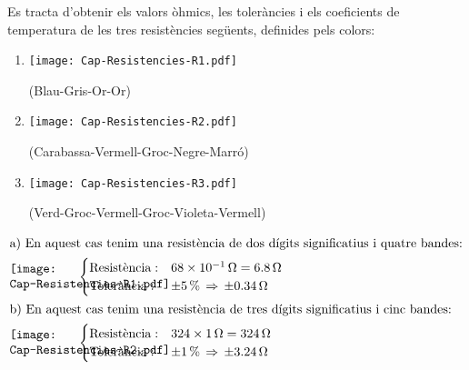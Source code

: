 \begin{exemple}\label{ex:resistencies-colors}
   Es tracta d'obtenir els valors òhmics, les toleràncies i els coeficients de temperatura de les tres resistències següents,
   definides pels colors:
    \begin{enumerate}
       \renewcommand{\labelenumi}{\alph{enumi})}
       \item \begin{minipage}{1.8cm}
               \texttt{[image: Cap-Resistencies-R1.pdf]}
            \end{minipage} (Blau-Gris-Or-Or)
       \item  \begin{minipage}{1.8cm}
               \texttt{[image: Cap-Resistencies-R2.pdf]}
            \end{minipage} (Carabassa-Vermell-Groc-Negre-Marró)
        \item  \begin{minipage}{1.8cm}
        	\texttt{[image: Cap-Resistencies-R3.pdf]}
        \end{minipage} (Verd-Groc-Vermell-Groc-Violeta-Vermell)
    \end{enumerate}
    \begin{align*}
       \intertext{a) En aquest  cas tenim una resistència de dos dígits significatius i quatre bandes:}
      \begin{minipage}{1.8cm}
      	\texttt{[image: Cap-Resistencies-R1.pdf]}
      \end{minipage}  \,  &
       \begin{cases}
          \text{Resistència}: &\qty{68e-1}{\ohm} = \qty{6,8}{\ohm} \\
          \text{Tolerància}:  &\qty{\pm 5}{\percent} \, \Rightarrow \, \qty{\pm 0,34}{\ohm}
       \end{cases} \\
       \intertext{b) En aquest  cas  tenim una resistència de tres dígits significatius i cinc bandes:}
       \begin{minipage}{1.8cm}
       	\texttt{[image: Cap-Resistencies-R2.pdf]}
       \end{minipage} \,  &
       \begin{cases}
          \text{Resistència}: &324 \times \qty{1}{\ohm} = \qty{324}{\ohm} \\
          \text{Tolerància}:  &\qty{\pm 1}{\percent} \, \Rightarrow \, \qty{\pm 3,24}{\ohm}

\end{cases}
\end{align*}
\end{exemple}
